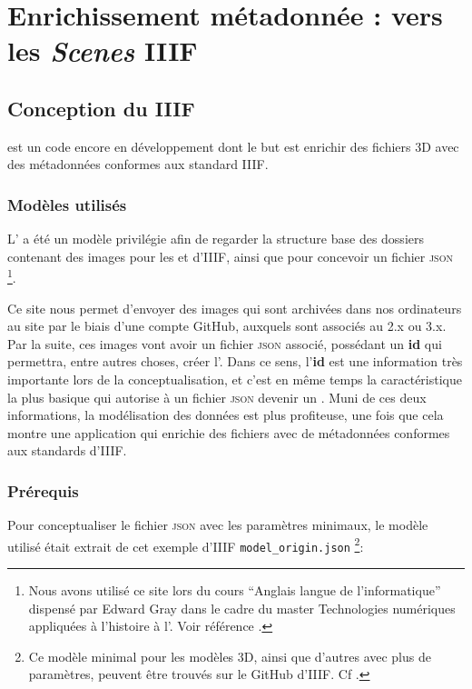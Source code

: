 \chapter{Enrichissement métadonnée : vers les \textit{Scenes} IIIF}
    \section{Conception du \dsc IIIF}
    \diiif est un code \py encore en développement dont le but est enrichir des fichiers 3D avec des métadonnées conformes aux standard IIIF.
        \subsection{Modèles utilisés}
        L' a été un modèle privilégie afin de regarder la structure base des dossiers contenant des images pour les  et  d'IIIF, ainsi que pour concevoir un fichier \textsc{json} \footnote{Nous avons utilisé ce site lors du cours \enquote{Anglais langue de l'informatique} dispensé par Edward Gray dans le cadre du master Technologies numériques appliquées à l'histoire à l'\enc. Voir référence \cite{gdmrworkbench}.}.
        
        Ce site nous permet d'envoyer des images qui sont archivées dans nos ordinateurs au site par le biais d'une compte GitHub, auxquels sont associés au  2.x ou 3.x. Par la suite, ces images vont avoir un fichier \textsc{json} associé, possédant un \textbf{id} qui permettra, entre autres choses, créer l'. Dans ce sens, l'\textbf{id} est une information très importante lors de la conceptualisation, et c'est en même temps la caractéristique la plus basique qui autorise à un fichier \textsc{json} devenir un . Muni de ces deux informations, la modélisation des données est plus profiteuse, une fois que cela montre une application qui enrichie des fichiers avec de métadonnées conformes aux standards d'IIIF.

        \subsection{Prérequis}
        Pour conceptualiser le fichier \textsc{json} avec les paramètres minimaux, le modèle utilisé était extrait de cet exemple d'IIIF \texttt{model\_origin.json} \footnote{Ce modèle minimal pour les modèles 3D, ainsi que d'autres avec plus de paramètres, peuvent être trouvés sur le GitHub d'IIIF. Cf \cite{iiif3dmodelorigin}.}:

